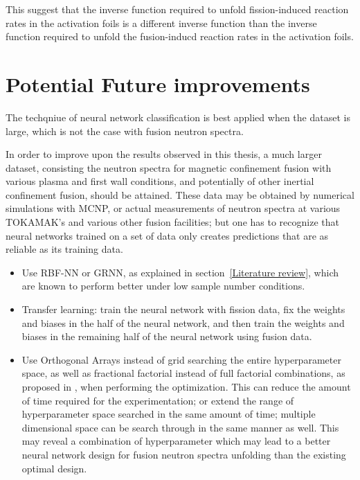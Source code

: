 \documentclass[a4paper, 12pt]{article}
\begin{document}
This suggest that the inverse function required to unfold fission-induced reaction rates in the activation foils is a different inverse function than the inverse function required to unfold the fusion-inducd reaction rates in the activation foils.%

\section{Potential Future improvements}
The techqniue of neural network classification is best applied when the dataset is large, which is not the case with fusion neutron spectra.

In order to improve upon the results observed in this thesis, a much larger dataset, consisting the neutron spectra for magnetic confinement fusion with various plasma and first wall conditions, and potentially of other inertial confinement fusion, should be attained. These data may be obtained by numerical simulations with MCNP, or actual measurements of neutron spectra at various TOKAMAK's and various other fusion facilities; but one has to recognize that neural networks trained on a set of data only creates predictions that are as reliable as its training data.%

\begin{itemize}
    \item Use RBF-NN or GRNN, as explained in section~\ref{Literature review}, which are known to perform better under low sample number conditions.
    \item Transfer learning\cite{TransferLearning}: train the neural network with fission data, fix the weights and biases in the half of the neural network, and then train the weights and biases in the remaining half of the neural network using fusion data.
    \item Use Orthogonal Arrays instead of grid searching the entire hyperparameter space, as well as fractional factorial instead of full factorial combinations, as proposed in \cite{RDANNM}, when performing the optimization. This can reduce the amount of time required for the experimentation; or extend the range of hyperparameter space searched in the same amount of time; multiple dimensional space can be search through in the same manner as well. This may reveal a combination of hyperparameter which may lead to a better neural network design for fusion neutron spectra unfolding than the existing optimal design.
\end{itemize}
\end{document}

